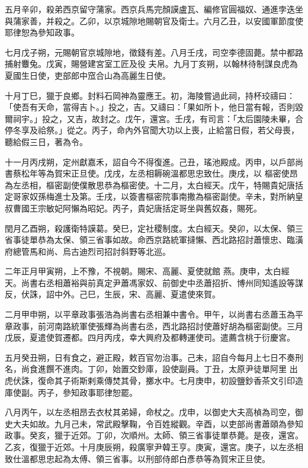 \begin{pinyinscope}
 五月辛卯，殺弟西京留守蒲家。西京兵馬完顏謨盧瓦、編修官圓福奴、通進孛迭坐與蒲家善，并殺之。乙卯，以京城隙地賜朝官及衛士。六月乙丑，以安國軍節度使耶律恕為參知政事。



 七月戊子朔，元賜朝官京城隙地，徵錢有差。八月壬戌，司空李德固薨。禁中都路捕射麞兔。戊寅，賜營建宮室工匠及役
 夫帛。九月丁亥朔，以翰林待制謀良虎為夏國生日使，吏部郎中窊合山為高麗生日使。



 十月丁巳，獵于良鄉。封料石岡神為靈應王。初，海陵嘗過此祠，持杯珓禱曰：「使吾有天命，當得吉卜。」投之，吉。又禱曰：「果如所卜，他日當有報，否則毀爾祠宇。」投之，又吉，故封之。戊午，還宮。壬戌，有司言：「太后園陵未畢，合停冬享及祫祭。」從之。丙子，命內外官聞大功以上喪，止給當日假，若父母喪，聽給假三日，著為令。



 十一月丙戌朔，定州獻嘉禾，詔自今不得復進。己丑，瑤池殿成。丙申，以戶部尚書蔡松年等為賀宋正旦使。戊戌，左丞相耨碗溫都思忠致仕。庚戌，以
 樞密使昂為左丞相，樞密副使僕散思恭為樞密使。十二月，太白經天。戊午，特賜貴妃唐括定哥家奴孫梅進士及第。壬戌，以簽書樞密院事南撒為樞密副使。辛未，對所納皇叔曹國王宗敏妃阿懶為昭妃。丙子，貴妃唐括定哥坐與舊奴姦，賜死。



 閏月乙酉朔，殺護衛特謨葛。癸巳，定社稷制度。太白經天。癸卯，以太保、領三省事徒單恭為太保、領三省事如故。命西京路統軍撻懶、西北路招討蕭懷忠、臨潢府總管馬和尚、烏古迪烈司招討斜野等北巡。



 二年正月甲寅朔，上不豫，不視朝。賜宋、高麗、夏使就館
 燕。庚申，太白經天。尚書右丞相蕭裕與前真定尹蕭馮家奴、前御史中丞蕭招折、博州同知遙設等謀反，伏誅，詔中外。己巳，生辰，宋、高麗、夏遣使來賀。



 二月甲申朔，以平章政事張浩為尚書右丞相兼中書令。甲午，以尚書右丞蕭玉為平章政事，前河南路統軍使張輝為尚書右丞，西北路招討使蕭好胡為樞密副使。三月戊辰，夏遣使賀遷都。四月丙戌，幸大興府及都轉運使司。遣薦含桃于衍慶宮。



 五月癸丑朔，日有食之，避正殿，敕百官勿治事。己未，詔自今每月上七日不奏刑名，尚食進饌不進肉。丁卯，始置交鈔庫，設使副員。丁丑，太原尹徒單阿里
 出虎伏誅，復命其子術斯剌乘傳焚其骨，擲水中。七月庚申，初設鹽鈔香茶文引印造庫使副。丙子，參知政事耶律恕罷。



 八月丙午，以左丞相昂去衣杖其弟婦，命杖之。戊申，以御史大夫高楨為司空，御史大夫如故。九月己未，常武殿擊鞠，令百姓縱觀。辛酉，以吏部尚書蕭頤為參知政事。癸亥，獵于近郊。丁卯，次順州。太師、領三省事徒單恭薨。是夜，還宮。乙亥，復獵于近郊。十月庚辰朔，殺廣寧尹韓王亨。庚寅，還宮。庚子，以左丞相致仕溫都思忠起為太傅、領三省事。以刑部侍郎白彥恭等為賀宋正旦使。




\end{pinyinscope}
